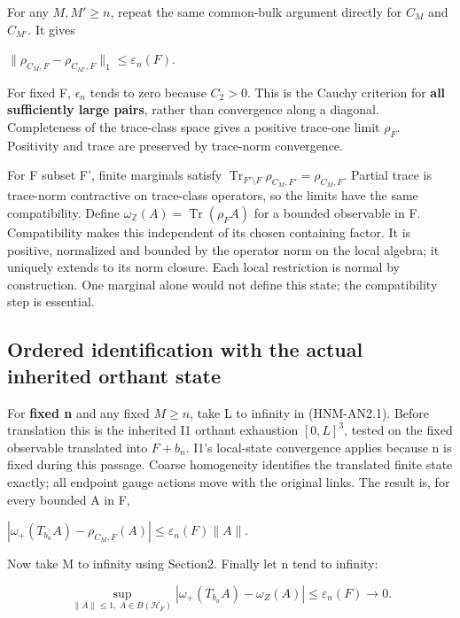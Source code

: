 For any \(M,M'\ge n\), repeat the same common-bulk argument directly for \(C_M\) and \(C_{M'}\). It gives

\(\|\rho_{C_M,F}-\rho_{C_{M\prime},F}\|_1\le\varepsilon_n(F)\).

For fixed F, \(\epsilon_n\) tends to zero because \(C_2>0\). This is the Cauchy criterion for \textbf{all sufficiently large pairs}, rather than convergence along a diagonal. Completeness of the trace-class space gives a positive trace-one limit \(\rho_F\). Positivity and trace are preserved by trace-norm convergence.

For F subset F', finite marginals satisfy \(\operatorname{Tr}_{F\prime\setminus F}\rho_{C_M,F\prime}=\rho_{C_M,F}\). Partial trace is trace-norm contractive on trace-class operators, so the limits have the same compatibility. Define \(\omega_{\mathbb Z}(A)=\operatorname{Tr}(\rho_F A)\) for a bounded observable in F. Compatibility makes this independent of its chosen containing factor. It is positive, normalized and bounded by the operator norm on the local algebra; it uniquely extends to its norm closure. Each local restriction is normal by construction. One marginal alone would not define this state; the compatibility step is essential.

\hypertarget{r29-an2-ordered-identification-with-the-actual-inherited-orthant-state}{%
\subsection{Ordered identification with the actual inherited orthant state}\label{r29:an2:r29-an2-ordered-identification-with-the-actual-inherited-orthant-state}}

For \textbf{fixed n} and any fixed \(M\ge n\), take L to infinity in (HNM-AN2.1). Before translation this is the inherited I1 orthant exhaustion \([0,L]^{3}\), tested on the fixed observable translated into \(F+b_n\). I1's local-state convergence applies because n is fixed during this passage. Coarse homogeneity identifies the translated finite state exactly; all endpoint gauge actions move with the original links. The result is, for every bounded A in F,

\(|\omega_+(T_{b_n}A)-\rho_{C_M,F}(A)|\le\varepsilon_n(F)\|A\|\).

Now take M to infinity using Section2. Finally let n tend to infinity:

\begin{equation}
\sup_{\|A\|\le1,\ A\in B(\mathcal H_F)}
|\omega_+(T_{b_n}A)-\omega_Z(A)|
\le\varepsilon_n(F)\longrightarrow0.
\tag{HNM-AN2.2}
\label{r29:an2:eq2}
\end{equation}

